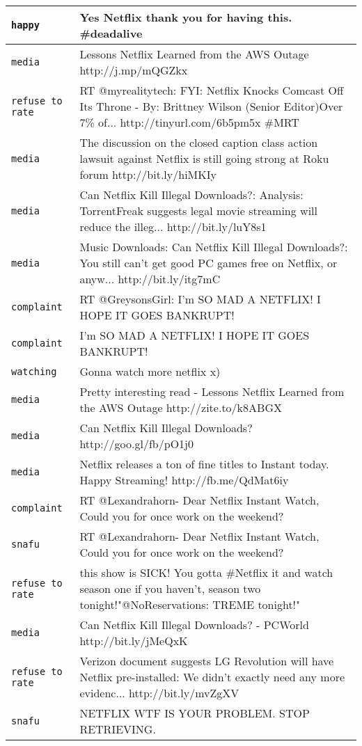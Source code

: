 {\begin{longtable}{|l|p{160mm}|}
      \tabularnewline\hline
         \texttt{happy} & Yes Netflix thank you for having this. \#deadalive
      \tabularnewline\hline
         \texttt{media} & Lessons Netflix Learned from the AWS Outage http://j.mp/mQGZkx
      \tabularnewline\hline
         \texttt{refuse to rate} & RT @myrealitytech: FYI: Netflix Knocks Comcast Off Its Throne - By: Brittney Wilson (Senior Editor)Over 7\% of... http://tinyurl.com/6b5pm5x \#MRT
      \tabularnewline\hline
         \texttt{media} & The discussion on the closed caption class action lawsuit against Netflix is still going strong at Roku forum http://bit.ly/hiMKIy
      \tabularnewline\hline
         \texttt{media} & Can Netflix Kill Illegal Downloads?: Analysis: TorrentFreak suggests legal movie streaming will reduce the illeg... http://bit.ly/luY8s1
      \tabularnewline\hline
         \texttt{media} & Music Downloads: Can Netflix Kill Illegal Downloads?: You still can't get good PC games free on Netflix, or anyw... http://bit.ly/itg7mC
      \tabularnewline\hline
         \texttt{complaint} & RT @GreysonsGirl: I'm SO MAD A NETFLIX! I HOPE IT GOES BANKRUPT!
      \tabularnewline\hline
         \texttt{complaint} & I'm SO MAD A NETFLIX! I HOPE IT GOES BANKRUPT!
      \tabularnewline\hline
         \texttt{watching} & Gonna watch more netflix x)
      \tabularnewline\hline
         \texttt{media} & Pretty interesting read - Lessons Netflix Learned from the AWS Outage http://zite.to/k8ABGX
      \tabularnewline\hline
         \texttt{media} & Can Netflix Kill Illegal Downloads? http://goo.gl/fb/pO1j0
      \tabularnewline\hline
         \texttt{media} & Netflix releases a ton of fine titles to Instant today. Happy Streaming! http://fb.me/QdMat6iy
      \tabularnewline\hline
         \texttt{complaint} & RT @Lexandrahorn- Dear Netflix Instant Watch, Could you for once work on the weekend?
      \tabularnewline\hline
         \texttt{snafu} & RT @Lexandrahorn- Dear Netflix Instant Watch, Could you for once work on the weekend?
      \tabularnewline\hline
         \texttt{refuse to rate} & this show is SICK! You gotta \#Netflix it and watch season one if you haven't, season two tonight!"@NoReservations: TREME tonight!"
      \tabularnewline\hline
         \texttt{media} & Can Netflix Kill Illegal Downloads? - PCWorld http://bit.ly/jMeQxK
      \tabularnewline\hline
         \texttt{refuse to rate} & Verizon document suggests LG Revolution will have Netflix pre-installed: We didn't exactly need any more evidenc... http://bit.ly/mvZgXV
      \tabularnewline\hline
         \texttt{snafu} & NETFLIX WTF IS YOUR PROBLEM. STOP RETRIEVING.

\end{longtable}}

